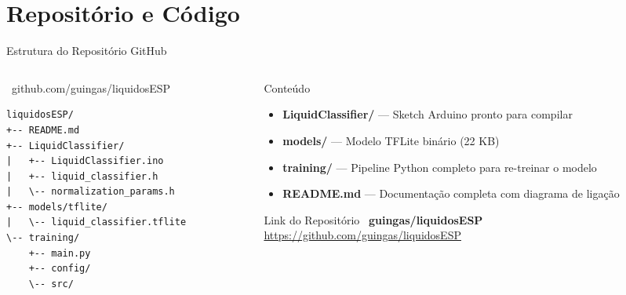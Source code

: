 \documentclass[aspectratio=169, 11pt]{beamer}
\begin{document}
\section{Repositório e Código}

\begin{frame}[fragile]{Estrutura do Repositório GitHub}
  \begin{columns}[T]
    \begin{column}{0.45\textwidth}
      \begin{block}{\faGithub\ github.com/guingas/liquidosESP}
        \begin{lstlisting}[basicstyle=\ttfamily\scriptsize,frame=none,backgroundcolor=\color{fordblue!5}]
liquidosESP/
+-- README.md
+-- LiquidClassifier/
|   +-- LiquidClassifier.ino
|   +-- liquid_classifier.h
|   \-- normalization_params.h
+-- models/tflite/
|   \-- liquid_classifier.tflite
\-- training/
    +-- main.py
    +-- config/
    \-- src/
        \end{lstlisting}
      \end{block}
    \end{column}
    \begin{column}{0.5\textwidth}
      \begin{block}{Conteúdo}
        \begin{itemize}
          \item \textbf{LiquidClassifier/} — Sketch Arduino pronto para compilar
          \item \textbf{models/} — Modelo TFLite binário (22 KB)
          \item \textbf{training/} — Pipeline Python completo para re-treinar o modelo
          \item \textbf{README.md} — Documentação completa com diagrama de ligação
        \end{itemize}
      \end{block}
      \vspace{0.2cm}
      \begin{exampleblock}{Link do Repositório}
        \centering
        \Large\faGithub\ \textbf{guingas/liquidosESP}\\
        \small\url{https://github.com/guingas/liquidosESP}
      \end{exampleblock}
    \end{column}
  \end{columns}
\end{frame}
\end{document}
